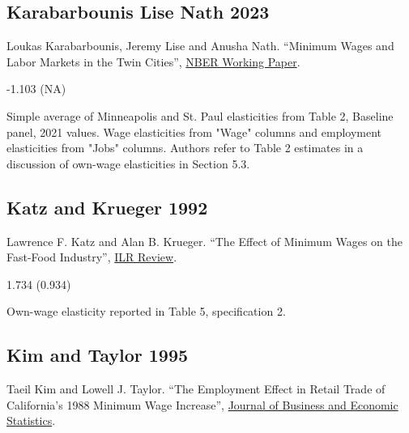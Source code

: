 \subsection*{Karabarbounis Lise Nath 2023}
\vspace{-0.7em}

\noindent Loukas Karabarbounis, Jeremy Lise and Anusha Nath. ``Minimum Wages and Labor Markets in the Twin Cities'', \href{https://www.nber.org/system/files/working_papers/w30239/w30239.pdf}{NBER Working Paper}.

\vspace{0.7em}

 -1.103 (NA)

\vspace{0.7em}

 Simple average of Minneapolis and St. Paul elasticities from Table 2, Baseline panel, 2021 values. Wage elasticities from "Wage" columns and employment elasticities from "Jobs" columns. Authors refer to Table 2 estimates in a discussion of own-wage elasticities in Section 5.3.

\subsection*{Katz and Krueger 1992}
\vspace{-0.7em}

\noindent Lawrence F. Katz and Alan B. Krueger. ``The Effect of Minimum Wages on the Fast-Food Industry'', \href{https://doi.org/10.1177/001979399204600102}{ILR Review}.

\vspace{0.7em}

 1.734 (0.934)

\vspace{0.7em}

 Own-wage elasticity reported in Table 5, specification 2.

\subsection*{Kim and Taylor 1995}
\vspace{-0.7em}

\noindent Taeil Kim and Lowell J. Taylor. ``The Employment Effect in Retail Trade of California’s 1988 Minimum Wage Increase'', \href{https://doi.org/10.1080/07350015.1995.10524591}{Journal of Business and Economic Statistics}.

